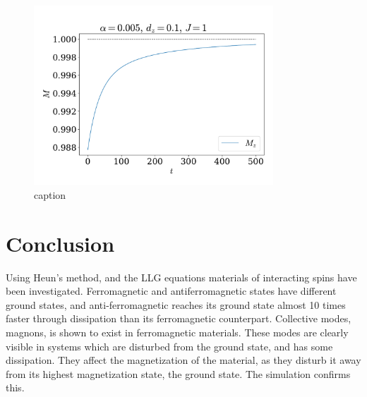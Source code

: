 \documentclass{article}
\begin{document}
    \begin{figure}
        \centering
        \includegraphics[width=0.8\textwidth]{../plots/mag.pdf}
        \caption{caption}
        \label{mag}
    \end{figure}

    \section*{Conclusion}
    Using Heun's method, and the LLG equations materials of interacting spins have been investigated. Ferromagnetic and antiferromagnetic states have different ground states, and anti-ferromagnetic reaches its ground state almost 10 times faster through dissipation than its ferromagnetic counterpart. Collective modes, magnons, is shown to exist in ferromagnetic materials. These modes are clearly visible in systems which are disturbed from the ground state, and has some dissipation. They affect the magnetization of the material, as they disturb it away from its highest magnetization state, the ground state. The simulation confirms this.

    
    
\end{document}
